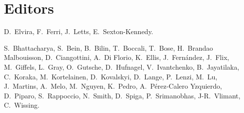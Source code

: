 






\clearpage

\section*{Editors}

D.~Elvira, F.~Ferri, J.~Letts, E.~Sexton-Kennedy.


S.~Bhattacharya, S.~Bein, B.~Bilin, T.~Boccali, T.~Bose, H.~Brandao Malbouisson, D.~Ciangottini, A.~Di Florio, K.~Ellis, J.~Fernández,  J.~Flix, M.~Giffels, L.~Gray, O.~Gutsche, D.~Hufnagel, V.~Ivantchenko, B.~Jayatilaka, C.~Koraka, M.~Kortelainen,  D.~Kovalskyi, D.~Lange, P.~Lenzi, M.~Lu, J.~Martins, A.~Melo, M.~Nguyen, K.~Pedro, A.~Pérez-Calero Yzquierdo, D.~Piparo, S.~Rappoccio, N.~Smith, D.~Spiga, P.~Srimanobhas, J-R.~Vlimant, C.~Wissing.  

